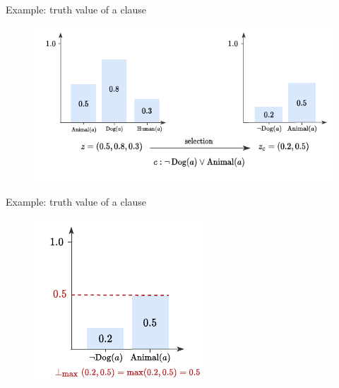 \documentclass{beamer}
\begin{document}
%		

\begin{frame}{Example: truth value of a clause}
	\begin{figure}
		\includegraphics[width=\linewidth]{images/example_clause_boosting0.pdf}
	\end{figure}
\end{frame}

\begin{frame}{Example: truth value of a clause}
	\begin{figure}
		\includegraphics[width=0.6\linewidth]{images/tvalues_literals.pdf}
	\end{figure}
\end{frame}
\end{document}
